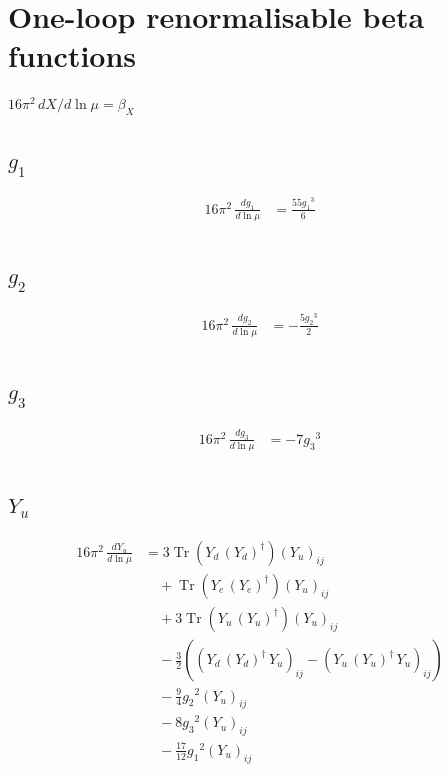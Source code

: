 \documentclass[10pt,a4paper]{article}
\begin{document}
\section*{One-loop renormalisable beta functions}
$16\pi^2\,dX/d\ln\mu=\beta_X$
\subsection*{$g_1$}
\begin{align*}
16\pi^2\,\frac{d g_1}{d\ln\mu} &=\frac{55 {g_1}^3}{6} \\
\end{align*}
\subsection*{$g_2$}
\begin{align*}
16\pi^2\,\frac{d g_2}{d\ln\mu} &=-\frac{5 {g_2}^3}{2} \\
\end{align*}
\subsection*{$g_3$}
\begin{align*}
16\pi^2\,\frac{d g_3}{d\ln\mu} &=-7 {g_3}^3 \\
\end{align*}
\subsection*{$Y_u$}
\begin{align*}
16\pi^2\,\frac{d Y_u}{d\ln\mu} &=3 \operatorname{Tr}\!\left({Y_d}\,\left({Y_d}\right)^{\dagger}\right) \left({Y_u}\right)_{ij} \\
&\quad +\operatorname{Tr}\!\left({Y_e}\,\left({Y_e}\right)^{\dagger}\right) \left({Y_u}\right)_{ij} \\
&\quad +3 \operatorname{Tr}\!\left({Y_u}\,\left({Y_u}\right)^{\dagger}\right) \left({Y_u}\right)_{ij} \\
&\quad -\frac{3}{2} (\left({Y_d}\,\left({Y_d}\right)^{\dagger}\,{Y_u}\right)_{ij}-\left({Y_u}\,\left({Y_u}\right)^{\dagger}\,{Y_u}\right)_{ij}) \\
&\quad -\frac{9}{4} {g_2}^2 \left({Y_u}\right)_{ij} \\
&\quad -8 {g_3}^2 \left({Y_u}\right)_{ij} \\
&\quad -\frac{17}{12} {g_1}^2 \left({Y_u}\right)_{ij} \\
\end{align*}
\end{document}

